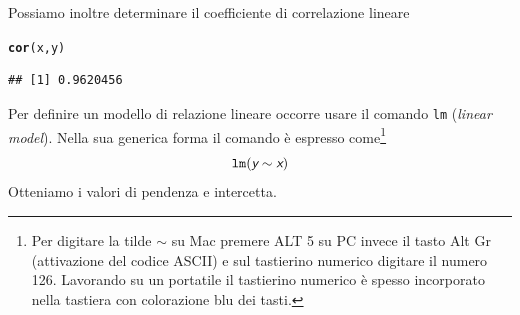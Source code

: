 \documentclass[onecolumn,12pt]{book}\usepackage[]{graphicx}\usepackage[]{color}
\makeatletter
\newcommand{\hlstd}[1]{\textcolor[rgb]{0.345,0.345,0.345}{#1}}%
\newcommand{\hlkwd}[1]{\textcolor[rgb]{0.737,0.353,0.396}{\textbf{#1}}}%
\newenvironment{kframe}{%
 \def\at@end@of@kframe{}%
 \ifinner\ifhmode%
  \def\at@end@of@kframe{\end{minipage}}%
  \begin{minipage}{\columnwidth}%
 \fi\fi%
 \def\FrameCommand##1{\hskip\@totalleftmargin \hskip-\fboxsep
 \colorbox{shadecolor}{##1}\hskip-\fboxsep
     \hskip-\linewidth \hskip-\@totalleftmargin \hskip\columnwidth}%
 \MakeFramed {\advance\hsize-\width
   \@totalleftmargin\z@ \linewidth\hsize
   \@setminipage}}%
 {\par\unskip\endMakeFramed%
 \at@end@of@kframe}
\newenvironment{knitrout}{}{} %
\newcommand{\varia}[1]{\textsl{\textsf{#1}}}
\newcommand{\mytilde}{$\sim$}
\makeatother
\begin{document}
Possiamo inoltre determinare il coefficiente di correlazione lineare
\begin{knitrout}
\color{fgcolor}\begin{kframe}
\begin{alltt}
\hlkwd{cor}\hlstd{(x,y)}
\end{alltt}
\begin{verbatim}
## [1] 0.9620456
\end{verbatim}
\end{kframe}
\end{knitrout}
Per definire un modello di relazione lineare occorre usare il comando \texttt{lm} (\varia{linear model}).
Nella sua generica forma il comando \`e espresso come\footnote{ Per digitare la tilde  \mytilde\;  su Mac premere ALT 5 su PC invece il tasto Alt Gr (attivazione del codice ASCII) e sul tastierino numerico digitare il numero 126. Lavorando su un portatile il tastierino numerico \`e spesso incorporato nella tastiera con colorazione blu dei tasti.}
$$\texttt{lm}(\varia{y} \sim  \varia{x})$$
Otteniamo i valori di pendenza e intercetta.
\end{document}
